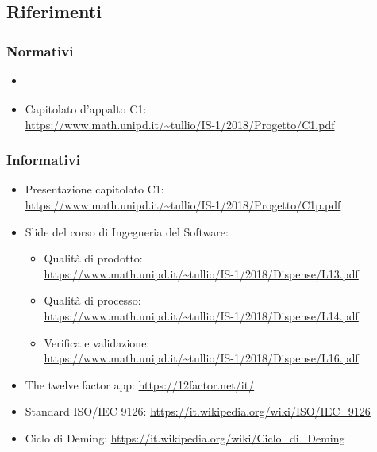     \subsection{Riferimenti}
	
	\subsubsection{Normativi}
    \begin{itemize}
    	\item \textit{\NdPv}
    	\item Capitolato d'appalto C1:\\ \url{https://www.math.unipd.it/~tullio/IS-1/2018/Progetto/C1.pdf}
    \end{itemize}
    
    \subsubsection{Informativi}
    \begin{itemize}
    	\item Presentazione capitolato C1:\\ \url{https://www.math.unipd.it/~tullio/IS-1/2018/Progetto/C1p.pdf}
    	\item Slide del corso di Ingegneria del Software:
    	
    	\begin{itemize}
    		\item Qualità di prodotto:\\ \url{https://www.math.unipd.it/~tullio/IS-1/2018/Dispense/L13.pdf}
    		\item Qualità di processo:\\ \url{https://www.math.unipd.it/~tullio/IS-1/2018/Dispense/L14.pdf}
    		\item Verifica e validazione:\\
    		\url{https://www.math.unipd.it/~tullio/IS-1/2018/Dispense/L16.pdf}
    	\end{itemize}
    	\item The twelve factor app:
    	\url{https://12factor.net/it/}
    	\item Standard ISO/IEC 9126:
    	\url{https://it.wikipedia.org/wiki/ISO/IEC_9126}
    	\item Ciclo di Deming:
    	\url{https://it.wikipedia.org/wiki/Ciclo_di_Deming}
    \end{itemize}